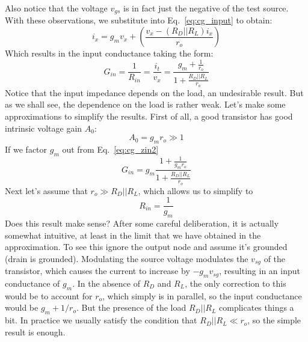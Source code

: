 Also notice that the voltage $v_{gs}$ is in fact just the negative of the test source.  With these observations, we substitute into Eq.~\ref{eq:cg_input} to obtain:
    \begin{equation}
        {i_x} = {g_m}{v_x} + \left( {\frac{{{v_x} - \left( {{R_D}||{R_L}} \right){i_x}}}{{{r_o}}}} \right)
    \end{equation}
Which results in the input conductance taking the form:
    \begin{equation}
        G_{in} = \frac{1}{{{R_{in}}}} = \frac{{{i_t}}}{{{v_x}}} = \frac{{{g_m} + \frac{1}{{{r_o}}}}}{{1 + \frac{{{R_D}||{R_L}}}{{{r_o}}}}} \label{eq:cg_zin2}
    \end{equation}
Notice that the input impedance depends on the load, an undesirable result.  But as we shall see, the dependence on the load is rather weak.  Let's make some approximations to simplify the results.  First of all, a good transistor has good intrinsic voltage gain $A_0$: 
    \begin{equation}
        A_0 = g_m r_o \gg 1
    \end{equation}
If we factor $g_m$ out from Eq.~\ref{eq:cg_zin2}
    \begin{equation}
        G_{in} = g_m \frac{{1 + \frac{1}{{{g_m r_o}}}}}{{1 + \frac{{{R_D}||{R_L}}}{{{r_o}}}}}
    \end{equation}
Next let's assume that $r_o \gg R_D||R_L$, which allows us to simplify to
    \begin{equation}
        {R_{in}} = \frac{1}{{{g_m}}}
    \end{equation}
Does this result make sense?  After some careful deliberation, it is actually somewhat intuitive, at least in the limit that we have obtained in the approximation.  To see this ignore the output node and assume it's grounded (drain is grounded). Modulating the source voltage modulates the $v_{sg}$ of the transistor, which causes the current to increase by $-g_m v_{sg}$, resulting in an input conductance of $g_m$.  In the absence of $R_D$ and $R_L$, the only correction to this would be to account for $r_o$, which simply is in parallel, so the input conductance would be $g_m + 1/r_o$.  But the presence of the load $R_D || R_L$ complicates things a bit.  In practice we usually satisfy the condition that $R_D || R_L \ll r_o$, so the simple result is enough. 
